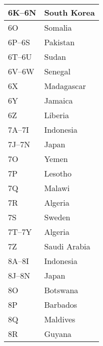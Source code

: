 \begin{longtable}{|l|l|}
  6K--6N              & South Korea                               \\
  \hline
  6O                  & Somalia                                   \\
  \hline
  6P--6S              & Pakistan                                  \\
  \hline
  6T--6U              & Sudan                                     \\
  \hline
  6V--6W              & Senegal                                   \\
  \hline
  6X                  & Madagascar                                \\
  \hline
  6Y                  & Jamaica                                   \\
  \hline
  6Z                  & Liberia                                   \\
  \hline
  7A--7I              & Indonesia                                 \\
  \hline
  7J--7N              & Japan                                     \\
  \hline
  7O                  & Yemen                                     \\
  \hline
  7P                  & Lesotho                                   \\
  \hline
  7Q                  & Malawi                                    \\
  \hline
  7R                  & Algeria                                   \\
  \hline
  7S                  & Sweden                                    \\
  \hline
  7T--7Y              & Algeria                                   \\
  \hline
  7Z                  & Saudi Arabia                              \\
  \hline
  8A--8I              & Indonesia                                 \\
  \hline
  8J--8N              & Japan                                     \\
  \hline
  8O                  & Botswana                                  \\
  \hline
  8P                  & Barbados                                  \\
  \hline
  8Q                  & Maldives                                  \\
  \hline
  8R                  & Guyana                                    \\

\end{longtable}

